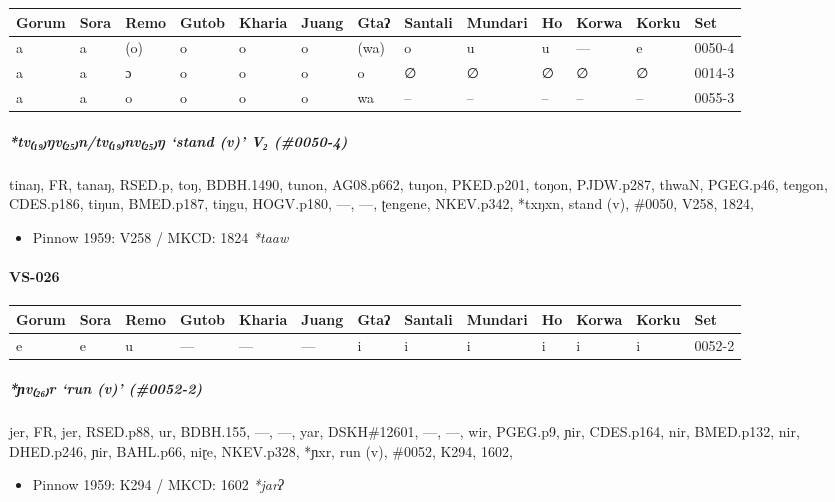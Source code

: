\documentclass[a4paper,]{article}
\providecommand{\tightlist}{%
  \setlength{\itemsep}{0pt}\setlength{\parskip}{0pt}}
\let\oldparagraph\paragraph
\renewcommand{\paragraph}[1]{\oldparagraph{#1}\mbox{}}
\let\oldsubparagraph\subparagraph
\renewcommand{\subparagraph}[1]{\oldsubparagraph{#1}\mbox{}}
\begin{document}
\begin{longtable}[]{@{}lllllllllllll@{}}
\toprule
Gorum & Sora & Remo & Gutob & Kharia & Juang & Gtaʔ & Santali & Mundari
& Ho & Korwa & Korku & Set\tabularnewline
\midrule
\endhead
a & a & (o) & o & o & o & (wa) & o & u & u & --- & e &
0050-4\tabularnewline
a & a & ɔ & o & o & o & o & ∅ & ∅ & ∅ & ∅ & ∅ & 0014-3\tabularnewline
a & a & o & o & o & o & wa & -- & -- & -- & -- & -- &
0055-3\tabularnewline
\bottomrule
\end{longtable}

\subparagraph{\texorpdfstring{\emph{*tv₍₁₉₎ŋv₍₂₅₎n/tv₍₁₉₎nv₍₂₅₎ŋ} `stand
(v)' V₂
(\#0050-4)}{*tv₍₁₉₎ŋv₍₂₅₎n/tv₍₁₉₎nv₍₂₅₎ŋ stand (v) V₂ (\#0050-4)}}\label{tvux14bvntvnvux14b-stand-v-v-0050-4}

tinaŋ, FR, tanaŋ, RSED.p, toŋ, BDBH.1490, tunon, AG08.p662, tuŋon,
PKED.p201, toŋon, PJDW.p287, thwaN, PGEG.p46, teŋgon, CDES.p186, tiŋun,
BMED.p187, tiŋgu, HOGV.p180, ---, ---, ʈengene, NKEV.p342, *txŋxn, stand
(v), \#0050, V258, 1824,

\begin{itemize}
\tightlist
\item
  Pinnow 1959: V258 / MKCD: 1824 \emph{*taaw}
\end{itemize}

\paragraph{VS-026}\label{vs-026}

\begin{longtable}[]{@{}lllllllllllll@{}}
\toprule
Gorum & Sora & Remo & Gutob & Kharia & Juang & Gtaʔ & Santali & Mundari
& Ho & Korwa & Korku & Set\tabularnewline
\midrule
\endhead
e & e & u & --- & --- & --- & i & i & i & i & i & i &
0052-2\tabularnewline
\bottomrule
\end{longtable}

\subparagraph{\texorpdfstring{\emph{*ɲv₍₂₆₎r} `run (v)'
(\#0052-2)}{*ɲv₍₂₆₎r run (v) (\#0052-2)}}\label{ux272vr-run-v-0052-2}

jer, FR, jer, RSED.p88, ur, BDBH.155, ---, ---, yar, DSKH\#12601, ---,
---, wir, PGEG.p9, ɲir, CDES.p164, nir, BMED.p132, nir, DHED.p246, ɲir,
BAHL.p66, niɽe, NKEV.p328, *ɲxr, run (v), \#0052, K294, 1602,

\begin{itemize}
\tightlist
\item
  Pinnow 1959: K294 / MKCD: 1602 \emph{*jarʔ}
\end{itemize}
\end{document}
